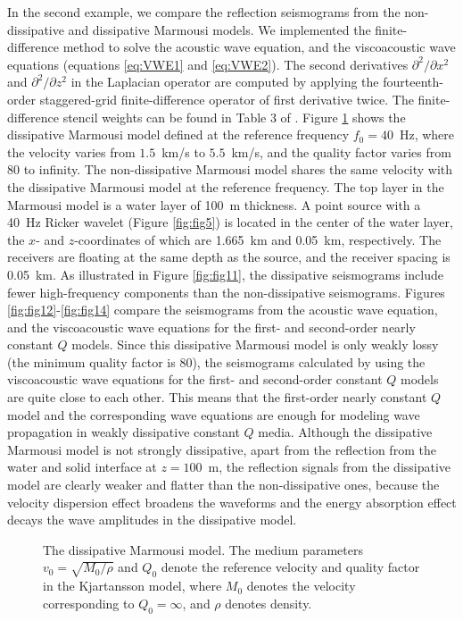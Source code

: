 \documentclass[article]{./macros/elsarticle_qh}
\begin{document}
In the second example, we compare the reflection seismograms from the non-dissipative and dissipative Marmousi models. We implemented the finite-difference method \cite[]{carcione:2014} to solve the acoustic wave equation, and the viscoacoustic wave equations (equations  \ref{eq:VWE1} and \ref{eq:VWE2}). The second derivatives $ \partial^2/\partial x^2$ and $\partial^2/\partial z^2$ in the Laplacian operator are computed by applying the fourteenth-order staggered-grid finite-difference operator of first derivative twice. The finite-difference stencil weights can be found in Table 3 of \cite{chu.stoffa:2012}. Figure \ref{fig:fig10} shows the dissipative Marmousi model defined at the reference frequency $f_{0}=40$~Hz, where the velocity varies from $1.5$~km/s to $5.5$~km/s, and the quality factor varies from 80 to infinity. The non-dissipative Marmousi model shares the same velocity with the dissipative Marmousi model at the reference frequency. The top layer in the Marmousi model is a water layer of 100~m thickness. A point source with a 40~Hz Ricker wavelet (Figure \ref{fig:fig5}) is located in the center of the water layer, the $x$- and $z$-coordinates of which are 1.665~km and 0.05~km, respectively. The receivers are floating at the same depth as the source, and the receiver spacing is 0.05~km. As illustrated in Figure \ref{fig:fig11}, the dissipative seismograms include fewer high-frequency components than the non-dissipative seismograms. Figures \ref{fig:fig12}-\ref{fig:fig14} compare the seismograms from the acoustic wave equation, and the viscoacoustic wave equations for the first- and second-order nearly constant $Q$ models. Since this dissipative Marmousi model is only weakly lossy (the minimum quality factor is 80), the seismograms calculated by using the viscoacoustic wave equations for the first- and second-order constant $Q$ models are quite close to each other. This means that the first-order nearly constant $Q$ model and the corresponding wave equations are enough for modeling wave propagation in  weakly dissipative constant $Q$ media. Although the dissipative Marmousi model is not strongly dissipative, apart from the reflection from the water and solid interface at $z=100$~m, the reflection signals from the dissipative model are clearly weaker and flatter than the non-dissipative ones, because the velocity dispersion effect broadens the waveforms and the energy absorption effect decays the wave amplitudes in the dissipative model. 

\begin{figure}[H]
\centering
\label{fig:v_noPML}
\qquad
\label{fig:iQ_noPML}
\caption{
The dissipative Marmousi model. The medium parameters $v_{0}=\sqrt{M_{0}/\rho}$ and $Q_{0}$ denote the reference velocity and quality factor in the Kjartansson model, where $M_{0}$ denotes the velocity corresponding to $Q_{0}=\infty$, and $\rho$ denotes density.  
}
\label{fig:fig10}
\end{figure}
\end{document}
